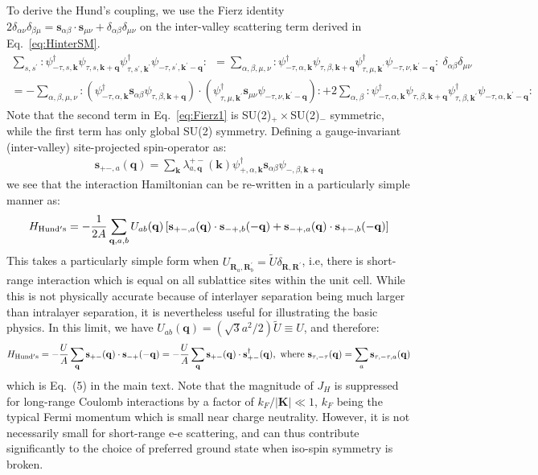 \documentclass[aps,pra,twocolumn,superscriptaddress,10pt,article,nofootinbib,showpacs,longbibliography]{revtex4-1}
\def \k{{\mathbf k}}
\def \q{{\mathbf q}}
\def \s{{\mathbf s}}
\def \R{{\mathbf R}}
\def \K{{\mathbf K}}
\def \R{{\mathbf R}}
\def \beq{\begin{eqnarray}}
\def \eeq{\end{eqnarray}}
\def \nn{\nonumber \\}
\begin{document}
To derive the Hund's coupling, we use the Fierz identity $2 \delta_{\alpha \nu} \delta_{\beta \mu } = \s_{\alpha \beta} \cdot \s_{\mu \nu } + \delta_{\alpha \beta} \delta_{\mu \nu}$ on the inter-valley scattering term derived in Eq.~\eqref{eq:HinterSM}.
\beq
\sum_{s,s^\prime} : \psi^\dagger_{-\tau,s,\k} \psi_{\tau, s, \k + \q} \psi^\dagger_{\tau, s^\prime, \k^\prime} \psi_{-\tau, s^\prime, \k^\prime - \q} : ~~ 
= \sum_{\alpha, \beta, \mu, \nu} : \psi^\dagger_{-\tau,\alpha,\k} \psi_{\tau, \beta, \k + \q} \psi^\dagger_{\tau, \mu, \k^\prime} \psi_{-\tau, \nu, \k^\prime - \q} :~ \delta_{\alpha \beta} \delta_{\mu \nu} \nn
= - \sum_{\alpha,
\beta,\mu,\nu} :( \psi^\dagger_{-\tau,\alpha,\k} \s_{\alpha  \beta} \psi_{\tau, \beta, \k + \q} ) \cdot (\psi^\dagger_{\tau, \mu, \k^\prime} \s_{\mu \nu} \psi_{-\tau, \nu, \k^\prime - \q}): + 2 \sum_{\alpha,\beta} : \psi^\dagger_{-\tau,\alpha,\k} \psi_{\tau, \beta, \k + \q} \psi^\dagger_{\tau, \beta, \k^\prime} \psi_{-\tau, \alpha, \k^\prime - \q}:
\label{eq:Fierz1}
\eeq
Note that the second term in Eq.~\eqref{eq:Fierz1} is SU(2)$_+\times$SU(2)$_-$ symmetric, while the first term has only global SU(2) symmetry. Defining a gauge-invariant (inter-valley) site-projected spin-operator as:
\beq
\s_{+-,a}(\q) =  \sum_\k \lambda_{a,\q}^{+ -}(\k) \psi^\dagger_{+,\alpha,\k} \s_{\alpha  \beta} \psi_{-, \beta, \k + \q} 
\eeq
we see that the interaction Hamiltonian can be re-written in a particularly simple manner as:
\beq
H_{\rm Hund's} = -\frac{1}{2A} \sum_{\q,a,b} U_{ab}(\q) \left[ \s_{+-,a}(\q) \cdot \s_{-+,b}(-\q) +  \s_{-+,a}(\q) \cdot \s_{+-,b}(-\q) \right]
\eeq
This takes a particularly simple form when $U_{\R_a, \R^\prime_b} = \tilde{U} \delta_{\R, \R^\prime}$, i.e, there is short-range interaction which is equal on all sublattice sites within the unit cell. 
While this is not physically accurate because of interlayer separation being much larger than intralayer separation, it is nevertheless useful for illustrating the basic physics. 
In this limit, we have $U_{ab}(\q) = (\sqrt{3}a^2/2)\tilde{U} \equiv U$, and therefore:
\beq
H_{\rm Hund's} = -\frac{U}{A} \sum_{\q}\s_{+-}(\q) \cdot \s_{-+}(-\q) = -\frac{U}{A} \sum_{\q}\s_{+-}(\q) \cdot \s_{+-}^\dagger(\q), \text{ where } \s_{\tau,-\tau}(\q) = \sum_a \s_{\tau,-\tau,a}(\q) 
\label{eq:HHundsSM}
\eeq
which is Eq.~(5) in the main text.
Note that the magnitude of $J_H$ is suppressed for long-range Coulomb interactions by a factor of $k_F/|\K| \ll 1$, $k_F$ being the typical Fermi momentum which is small near charge neutrality.
However, it is not necessarily small for short-range e-e scattering, and can thus contribute significantly to the choice of preferred ground state when iso-spin symmetry is broken.
\end{document}
